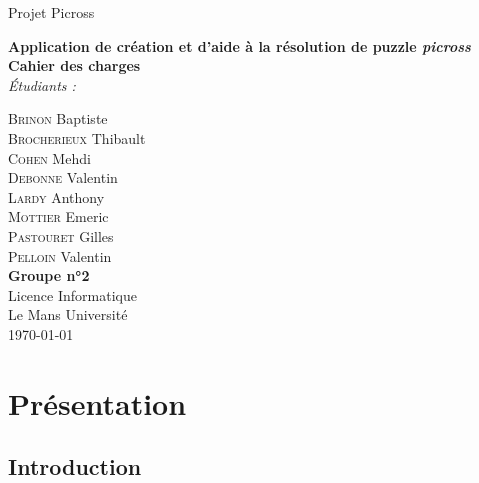 \documentclass{report}
\begin{document}
\begin{titlepage}
	\begin{center}
	
		\begin{spacing}{1.5}
			Projet Picross\\
			\vspace*{\fill}
		\end{spacing}
		
		\begin{spacing}{2.5}
			\textbf{\Huge Application de création et d'aide à la résolution de puzzle \textit{picross}}\\[0.5cm]
			\textbf{\huge Cahier des charges} \\
			\vspace*{\fill}
			\textit{Étudiants :}
		\end{spacing}

		\begin{spacing}{1.15}
			\large
			\textsc{Brinon} Baptiste\\
			\textsc{Brocherieux} Thibault\\
			\textsc{Cohen} Mehdi\\
			\textsc{Debonne} Valentin\\
			\textsc{Lardy} Anthony\\
			\textsc{Mottier} Emeric\\
			\textsc{Pastouret} Gilles\\
			\textsc{Pelloin} Valentin\\
			\vspace*{\fill}
			\textbf{Groupe n°2} \\
			\textnormal{\large Licence Informatique\\ Le Mans Université\\ \today}
		\end{spacing}
		
	\end{center}
\end{titlepage}


\renewcommand{\contentsname}{Sommaire}
\tableofcontents


\chapter{Présentation}

	\section{Introduction}
\end{document}
